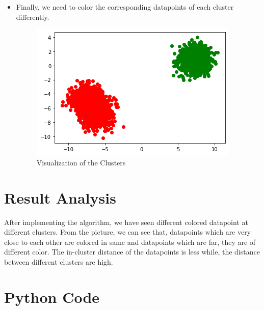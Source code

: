 \documentclass[conference]{IEEEtran}
\begin{document}
\begin{itemize}
\item Finally, we need to color the corresponding datapoints of each cluster differently. \\
\begin{figure}[htb!]
\centerline{\includegraphics[scale=0.5]{53.png}}
\caption{Visualization of the Clusters\\}
\label{fig}
\end{figure}
\end{itemize}

\section{Result Analysis}
After implementing the algorithm, we have seen different colored datapoint at different clusters. From the picture, we can see that, datapoints which are very close to each other are colored in same and datapoints which are far, they are of different color. The in-cluster distance of the datapoints is less while, the distance between different clusters are high.
\section{Python Code}
\end{document}
